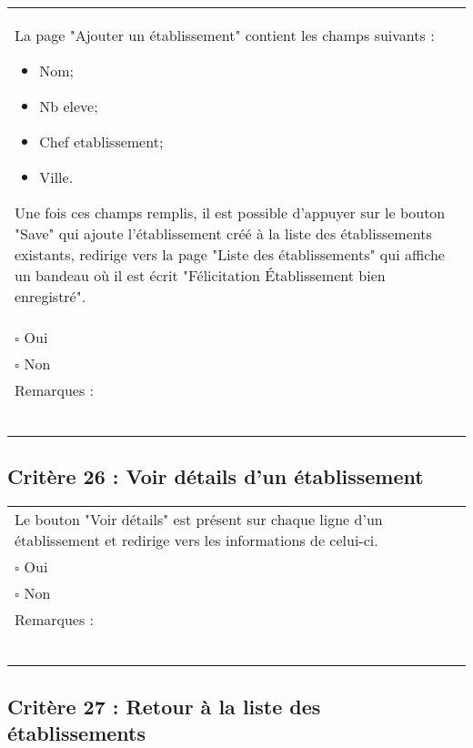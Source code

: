 	\begin{center}
    	 		\begin{tabular}[h]{|p{}|}
			\hline
				La page "Ajouter un établissement"  contient les champs suivants : 
				\begin{itemize}
					\item Nom;
					\item Nb eleve;
					\item Chef etablissement;
					\item Ville.
				\end{itemize}
				Une fois ces champs remplis, il est possible d'appuyer sur le bouton "Save" qui ajoute l'établissement créé à la liste des établissements existants, redirige vers la page "Liste des établissements" qui affiche un bandeau où il est écrit "Félicitation Établissement bien enregistré". \\
				$\square$ Oui  \\ $\square$ Non \\\hline Remarques : \\ ~\\
			 \\\hline
     		\end{tabular}
  		\end{center}	
  		
  		
  		\subsection*{Critère 26 : Voir détails d'un établissement}
	
	\begin{center}
    	 		\begin{tabular}[h]{|p{}|}
			\hline
				Le bouton "Voir détails" est présent sur chaque ligne d'un établissement et redirige vers les informations de celui-ci.\\
				$\square$ Oui  \\ $\square$ Non \\\hline Remarques : \\ ~\\
			 \\\hline
     		\end{tabular}
  		\end{center}	
  		
  		
  		\subsection*{Critère 27 : Retour à la liste des établissements}
	
